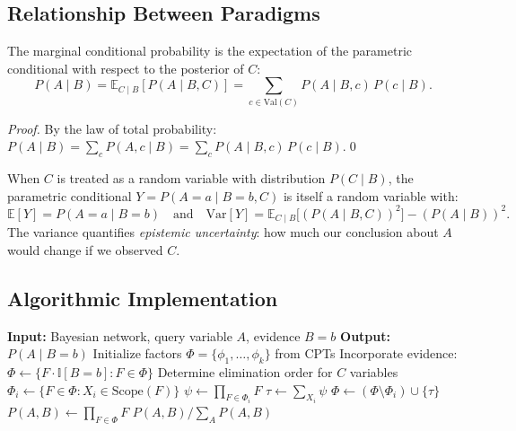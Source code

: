 \subsection{Relationship Between Paradigms}

\begin{theorem}
The marginal conditional probability is the expectation of the parametric
conditional with respect to the posterior of $C$:
\begin{equation}
P(A\mid B)=\mathbb{E}_{C\mid B}[P(A\mid B,C)]
=\sum_{c\in\mathrm{Val}(C)} P(A\mid B,c)\,P(c\mid B).
\end{equation}
\end{theorem}
\begin{proof}
By the law of total probability:
$P(A\mid B)=\sum_c P(A,c\mid B)=\sum_c P(A\mid B,c)\,P(c\mid B)$.\qed
\end{proof}

When $C$ is treated as a random variable with distribution $P(C\mid B)$,
the parametric conditional $Y=P(A=a\mid B=b,C)$ is itself a random
variable with:
\[
\mathbb{E}[Y]=P(A=a\mid B=b)\quad\text{and}\quad
\mathrm{Var}[Y]=\mathbb{E}_{C\mid B}\bigl[(P(A\mid B,C))^2\bigr]-(P(A\mid B))^2.
\]
The variance quantifies \emph{epistemic uncertainty}: how much our
conclusion about $A$ would change if we observed $C$.

\subsection{Algorithmic Implementation}

\begin{algorithmbox}
\begin{algorithm}[H]
\caption{Variable Elimination for $P(A\mid B)$}
\label{alg:ve}
\begin{algorithmic}[1]
\State \textbf{Input:} Bayesian network, query variable $A$, evidence $B=b$
\State \textbf{Output:} $P(A\mid B=b)$
\State Initialize factors $\Phi=\{\phi_1,\ldots,\phi_k\}$ from CPTs
\State Incorporate evidence: $\Phi\leftarrow\{F\cdot\mathbb{I}[B=b]:F\in\Phi\}$
\State Determine elimination order for $C$ variables
    \State $\Phi_i\leftarrow\{F\in\Phi:X_i\in\mathrm{Scope}(F)\}$
    \State $\psi\leftarrow\prod_{F\in\Phi_i}F$
    \State $\tau\leftarrow\sum_{X_i}\psi$
    \State $\Phi\leftarrow(\Phi\setminus\Phi_i)\cup\{\tau\}$
\EndFor
\State $P(A,B)\leftarrow\prod_{F\in\Phi}F$
\State \Return $P(A,B)/\sum_A P(A,B)$
\end{algorithmic}
\end{algorithm}
\end{algorithmbox}

